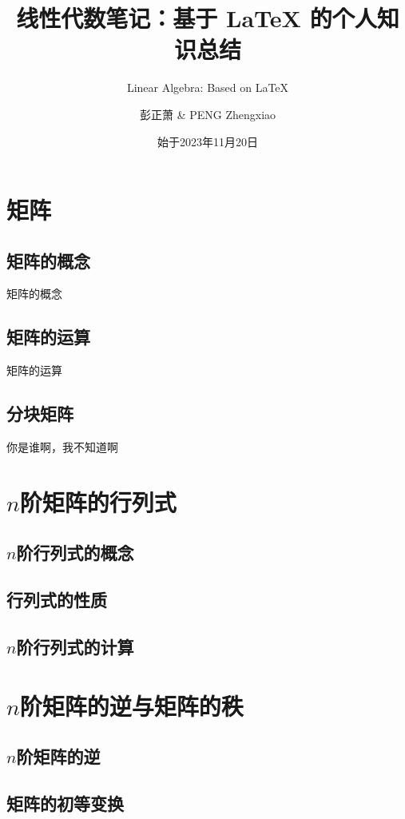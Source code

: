 \documentclass[lang=cn,10pt]{elegantbook}
\title{线性代数笔记：基于 \LaTeX{} 的个人知识总结}
\subtitle{Linear Algebra: Based on \LaTeX{} }
\author{彭正萧 \& PENG Zhengxiao}
\institute{西北农林科技大学}
\date{始于2023年11月20日}
\begin{document}
\maketitle
\frontmatter

\tableofcontents

\mainmatter

\chapter{矩阵}

	\section{矩阵的概念}
	矩阵的概念
	\section{矩阵的运算}
	矩阵的运算
	\section{分块矩阵}
	你是谁啊，我不知道啊
	
\chapter{\( n \)阶矩阵的行列式}

	\section{\( n \)阶行列式的概念}
	
	\section{行列式的性质}
	
	\section{\( n \)阶行列式的计算}
	
\chapter{\( n \)阶矩阵的逆与矩阵的秩}

	\section{\( n \)阶矩阵的逆}
	
	\section{矩阵的初等变换}
	
\end{document}
